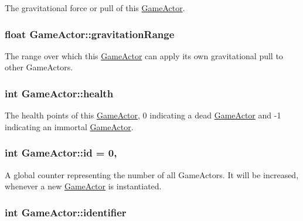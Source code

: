 The gravitational force or pull of this \hyperlink{class_game_actor}{Game\+Actor}. \hypertarget{class_game_actor_a9c0ba51b08a3e617d9629c0ee8d309f2}{
\subsubsection[{gravitation\+Range}]{\setlength{\rightskip}{0pt plus 5cm}float Game\+Actor\+::gravitation\+Range\hspace{0.3cm}{\ttfamily [protected]}}}\label{class_game_actor_a9c0ba51b08a3e617d9629c0ee8d309f2}
The range over which this \hyperlink{class_game_actor}{Game\+Actor} can apply its own gravitational pull to other Game\+Actors. \hypertarget{class_game_actor_a5d402a953140585fb7cc3f8a3a24a2a4}{
\subsubsection[{health}]{\setlength{\rightskip}{0pt plus 5cm}int Game\+Actor\+::health\hspace{0.3cm}{\ttfamily [protected]}}}\label{class_game_actor_a5d402a953140585fb7cc3f8a3a24a2a4}
The health points of this \hyperlink{class_game_actor}{Game\+Actor}, 0 indicating a dead \hyperlink{class_game_actor}{Game\+Actor} and -\/1 indicating an immortal \hyperlink{class_game_actor}{Game\+Actor}. \hypertarget{class_game_actor_a07be525e1e463a4f437dba30f0173b6c}{
\subsubsection[{id}]{\setlength{\rightskip}{0pt plus 5cm}int Game\+Actor\+::id = 0\hspace{0.3cm}{\ttfamily [static]}, {\ttfamily [protected]}}}\label{class_game_actor_a07be525e1e463a4f437dba30f0173b6c}
A global counter representing the number of all Game\+Actors. It will be increased, whenever a new \hyperlink{class_game_actor}{Game\+Actor} is instantiated. \hypertarget{class_game_actor_af0f1723601974c63c9df8a60a6ce7da7}{
\subsubsection[{identifier}]{\setlength{\rightskip}{0pt plus 5cm}int Game\+Actor\+::identifier\hspace{0.3cm}{\ttfamily [protected]}}}\label{class_game_actor_af0f1723601974c63c9df8a60a6ce7da7}
